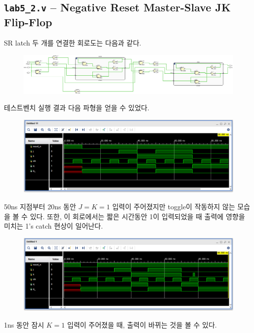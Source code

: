 \documentclass{scrartcl}
\begin{document}
\subsection{\texttt{lab5\_2.v} -- Negative Reset Master-Slave JK Flip-Flop}
SR latch 두 개를 연결한 회로도는 다음과 같다.
\begin{figure}[H]
  \centering
  \includegraphics[width=0.9\linewidth]{lab5_2_simple_schematic-crop.pdf}
\end{figure}
테스트벤치 실행 결과 다음 파형을 얻을 수 있었다.
\begin{figure}[H]
  \centering
  \includegraphics[width=0.9\linewidth]{lab5_2_simple_waveform.png}
\end{figure}
50ns 지점부터 20ns 동안 \(J = K = 1\) 입력이 주어졌지만 toggle이 작동하지 않는 모습을 볼 수 있다.
또한, 이 회로에서는 짧은 시간동안 1이 입력되었을 때 출력에 영향을 미치는 1's catch 현상이 일어난다.
\begin{figure}[H]
  \centering
  \includegraphics[width=0.9\linewidth]{lab5_2_simple_1catch_waveform.png}
\end{figure}
1ns 동안 잠시 \(K = 1\) 입력이 주어졌을 때, 출력이 바뀌는 것을 볼 수 있다.
\end{document}
